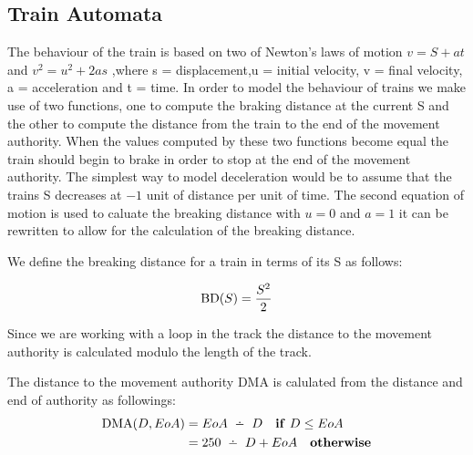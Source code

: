 \subsection*{Train Automata}

The behaviour of the train is based on two of Newton's laws of motion $v = S +at$ and  $v^2 = u^2 +2as$
,where s = displacement,u = initial velocity, v = final velocity, a = acceleration and t = time. In order to model the behaviour of trains we make use of two functions, one to compute the braking distance at the current S and the other to compute the distance from the train to the end of the movement authority. When the values computed by these two functions become equal the train should begin to brake in order to stop at the end of the movement authority. The simplest way to model deceleration would be to assume that the trains S decreases at $-1$ unit of distance per unit of time. The second equation of motion  is used to caluate the breaking distance with $u = 0$ and $a = 1$ it can be rewritten to allow for the calculation of the breaking distance.
\medskip

\begin{mydef}
We define the breaking distance for a train in terms of its S as follows:

$$\mathrm{BD}(S) = \frac{S^2}{2} $$

\end{mydef}
\medskip
Since we are working with a loop in the track the distance to the movement authority is calculated modulo the length of the track. 
\medskip

\begin{mydef}

The distance to the movement authority $\mathrm{DMA}$ is calulated from the distance and end of authority as followings:
\begin{align*}
\DMA{D}{EoA} & = EoA \Monus D \quad \mathbf{if} \ D \leq EoA \\
                         & = 250 \Monus D + EoA \quad \mathbf{otherwise}
\end{align*}



\end{mydef}

